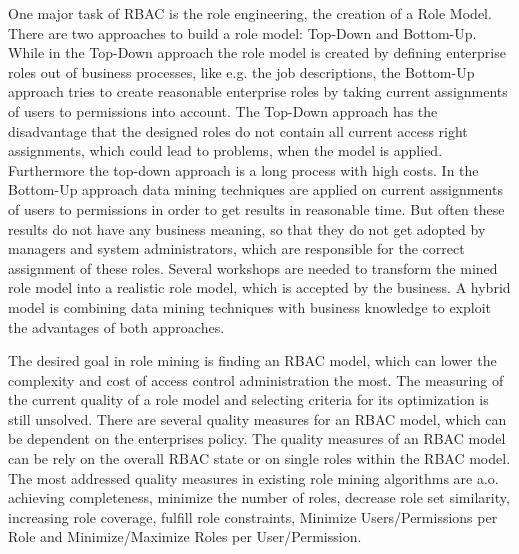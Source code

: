 One major task of \gls{RBAC} is the role engineering, the creation of a Role Model. There are two approaches to build a role model: Top-Down and Bottom-Up. While in the Top-Down approach the role model is created by defining enterprise roles out of business processes, like e.g. the job descriptions, the Bottom-Up approach tries to create reasonable enterprise roles by taking current assignments of users to permissions into account. The Top-Down approach has the disadvantage that the designed roles do not contain all current access right assignments, which could lead to problems, when the model is applied. Furthermore the top-down approach is a long process with high costs. In the Bottom-Up approach data mining techniques are applied on current assignments of users to permissions in order to get results in reasonable time. But often these results do not have any business meaning, so that they do not get adopted by managers and system administrators, which are responsible for the correct assignment of these roles. Several workshops are needed to transform the mined role model into a realistic role model, which is accepted by the business. A hybrid model is combining data mining techniques with business knowledge to exploit the advantages of both approaches. \cite{Frank} \cite{Xu} \cite{Coyne:2011}

The desired goal in role mining is finding an \gls{RBAC} model, which can lower the complexity and cost of access control administration the most. The measuring of the current quality of a role model and selecting criteria for its optimization is still unsolved. There are several quality measures for an \gls{RBAC} model, which can be dependent on the enterprises policy. The quality measures of an \gls{RBAC} model can be rely on the overall \gls{RBAC} state or on single roles within the \gls{RBAC} model. The most addressed quality measures in existing role mining algorithms are a.o. achieving completeness, minimize the number of roles, decrease role set similarity, increasing role coverage, fulfill role constraints, Minimize Users/Permissions per Role and Minimize/Maximize Roles per User/Permission. \cite{Kunz} 

\iffalse
The desired goal in role mining is finding the minimum number of meaningful roles which are comprehending all assignments of users to permissions in regard of the least privileged access principle. The least privileged access principle means giving a user account only those privileges which are essential to that user's work. Meaningful roles are roles which are accepted by the business.\\
\fi

